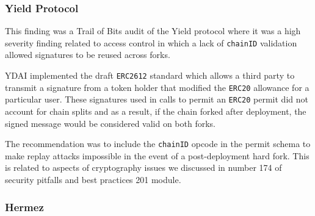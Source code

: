 \subsubsection{Yield Protocol}\label{yield-protocol}

This finding was a Trail of Bits audit of the Yield protocol where it
was a high severity finding related to access control in which a lack of
\texttt{chainID} validation allowed signatures to be reused across
forks.

YDAI implemented the draft \texttt{ERC2612} standard which allows a
third party to transmit a signature from a token holder that modified
the \texttt{ERC20} allowance for a particular user. These signatures
used in calls to permit an \texttt{ERC20} permit did not account for
chain splits and as a result, if the chain forked after deployment, the
signed message would be considered valid on both forks.

The recommendation was to include the \texttt{chainID} opcode in the
permit schema to make replay attacks impossible in the event of a
post-deployment hard fork. This is related to aspects of cryptography
issues we discussed in number 174 of security pitfalls and best
practices 201 module.

\subsubsection{Hermez}\label{hermez}

